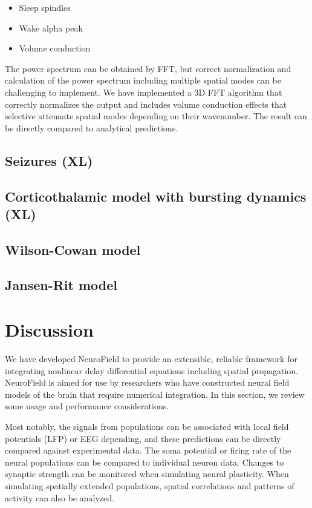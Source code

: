 \documentclass[preprint,review,10pt,authoryear,letterpaper]{elsarticle}
\begin{document}
\begin{itemize}
	\item Sleep spindles
	\item Wake alpha peak
	\item Volume conduction
\end{itemize}

The power spectrum can be obtained by FFT, but correct normalization and calculation of the power spectrum including multiple spatial modes can be challenging to implement. We have implemented a 3D FFT algorithm that correctly normalizes the output and includes volume conduction effects that selective attenuate spatial modes depending on their wavenumber. The result can be directly compared to analytical predictions.

\subsection{Seizures (XL)}
\label{sec:seizures}

\subsection{Corticothalamic model with bursting dynamics (XL)}
\label{sec:burst}

\subsection{Wilson-Cowan model}

\subsection{Jansen-Rit model}

\section{Discussion}
\label{sec:discussion}

We have developed NeuroField to provide an extensible, reliable framework for integrating nonlinear delay differential equations including spatial propagation. NeuroField is aimed for use by researchers who have constructed neural field models of the brain that require numerical integration. In this section, we review some usage and performance considerations.

Most notably, the signals from populations can be associated with local field potentials (LFP) or EEG depending, and these predictions can be directly compared against experimental data. The soma potential or firing rate of the neural populations can be compared to individual neuron data. Changes to synaptic strength can be monitored when simulating neural plasticity. When simulating spatially extended populations, spatial correlations and patterns of activity can also be analyzed. 
\end{document}
